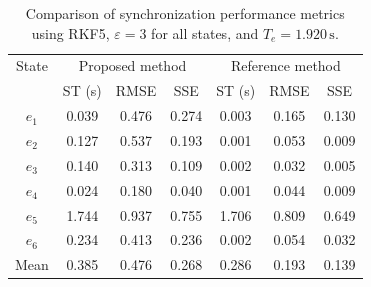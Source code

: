 \begin{table}[!t]
\centering
\caption{Comparison of synchronization performance metrics using RKF5, $\varepsilon=3$ for all states, and $T_e=1.920\,\mathrm{s}$.}
\renewcommand{\arraystretch}{1.15}
\begin{tabular}{c|ccc|ccc}
\hline
State & \multicolumn{3}{c|}{Proposed method} & \multicolumn{3}{c}{Reference method} \\
 & ST (s) & RMSE & SSE & ST (s) & RMSE & SSE \\
\hline
$e_1$ & 0.039 & 0.476 & 0.274 & 0.003 & 0.165 & 0.130 \\
$e_2$ & 0.127 & 0.537 & 0.193 & 0.001 & 0.053 & 0.009 \\
$e_3$ & 0.140 & 0.313 & 0.109 & 0.002 & 0.032 & 0.005 \\
$e_4$ & 0.024 & 0.180 & 0.040 & 0.001 & 0.044 & 0.009 \\
$e_5$ & 1.744 & 0.937 & 0.755 & 1.706 & 0.809 & 0.649 \\
$e_6$ & 0.234 & 0.413 & 0.236 & 0.002 & 0.054 & 0.032 \\
Mean & 0.385 & 0.476 & 0.268 & 0.286 & 0.193 & 0.139 \\
\hline
\end{tabular}
\end{table}
